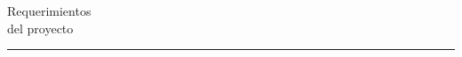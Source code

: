 \documentclass[14pt]{extarticle}
\author{
    Barrientos Álvarez Jorge Miguel Aaron \vspace{20pt}\\
    Onofre Martínez Maximiliano \vspace{20pt}\\
    Ortíz Amaya Bruno Fernando \vspace{20pt}\\
    Reyes López Eduardo Alfonso \vspace{20pt} \\
    Salazar Zaragoza Helen Michelle 
    }
\makeatletter
\def\printauthor{              
    {\large \@author}}
\makeatother
\begin{document}
	  
\begin{titlepage}
    \noindent
    \titlefont Requerimientos \\del proyecto
    \vfill
    \hfill
    \begin{minipage}{0.35\linewidth}
        \begin{flushright}
            \printauthor
        \end{flushright}
    \end{minipage}
    \begin{minipage}{0.02\linewidth}
        \rule{1pt}{300pt}
    \end{minipage}
    \end{titlepage}
    
    
    
    
\end{document}
